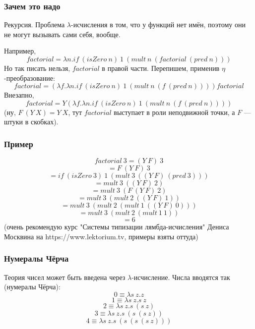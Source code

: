 \documentclass[xetex,mathserif,serif]{beamer}
\begin{document}
	\begin{frame}
		\frametitle{Зачем это надо}
		Рекурсия. Проблема $\lambda$-исчисления в том, что у функций нет имён, поэтому они не могут 
		вызывать сами себя, вообще.
		
		Например,
		$$factorial = \lambda n. if\ (isZero\ n)\ 1\ (mult\ n\ (factorial\ (pred\ n)))$$
		Но так писать нельзя, $factorial$ в правой части. Перепишем, применив $\eta$-преобразование:
		$$factorial = (\lambda f.\lambda n.if\ (isZero\ n)\ 1\ (mult\ n\ (f\ (pred\ n)))) factorial$$
		Внезапно, 
		$$factorial = Y (\lambda f.\lambda n.if\ (isZero\ n)\ 1\ (mult\ n\ (f\ (pred\ n))))$$
		(ну, $F\ (Y\ X) = Y\ X$, тут $factorial$ выступает в роли неподвижной точки, а $F$ --- 
		штуки в скобках).
	\end{frame}

	\begin{frame}
		\frametitle{Пример}
		$$factorial\ 3 = (Y\ F)\ 3$$
		$$= F\ (Y\ F)\ 3$$
		$$= if\ (isZero\ 3)\ 1\ (mult\ 3\ ((Y\ F)\ (pred\ 3)))$$
		$$= mult\ 3\ ((Y\ F)\ 2)$$
		$$= mult\ 3\ (F\ (Y\ F)\ 2)$$
		$$= mult\ 3\ (mult\ 2\ ((Y\ F)\ 1))$$
		$$= mult\ 3\ (mult\ 2\ (mult\ 1\ ((Y\ F)\ 0)))$$
		$$= mult\ 3\ (mult\ 2\ (mult\ 1\ 1))$$
		$$= 6$$
		(очень рекомендую курс "Системы типизации лямбда-исчисления" Дениса Москвина на https://www.lektorium.tv, примеры взяты оттуда)
	\end{frame}

	\begin{frame}
		\frametitle{Нумералы Чёрча}
		Теория чисел может быть введена через $\lambda$-исчисление. Числа вводятся так (нумералы
		Чёрча):
		$$0 \equiv \lambda s\ z.z$$
		$$1 \equiv \lambda s\ z.s\ z$$
		$$2 \equiv \lambda s\ z.s\ (s\ z)$$
		$$3 \equiv \lambda s\ z.s\ (s\ (s\ z))$$
		$$4 \equiv \lambda s\ z.s\ (s\ (s\ (s\ z)))$$
	\end{frame}
\end{document}
